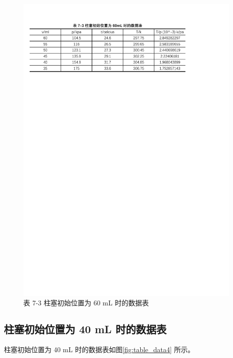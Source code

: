 \documentclass[12pt]{article}
\begin{document}
\begin{figure}[H] %
    \centering
    \includegraphics[width=\textwidth]{./figures/T7-3.pdf} 
    \caption{表 7-3 柱塞初始位置为 60 mL 时的数据表}
    \label{fig:table_data3}
\end{figure}

\subsection{\normalfont 柱塞初始位置为 40 mL 时的数据表}

柱塞初始位置为 40 mL 时的数据表如图\ref{fig:table_data4} 所示。
\end{document}
